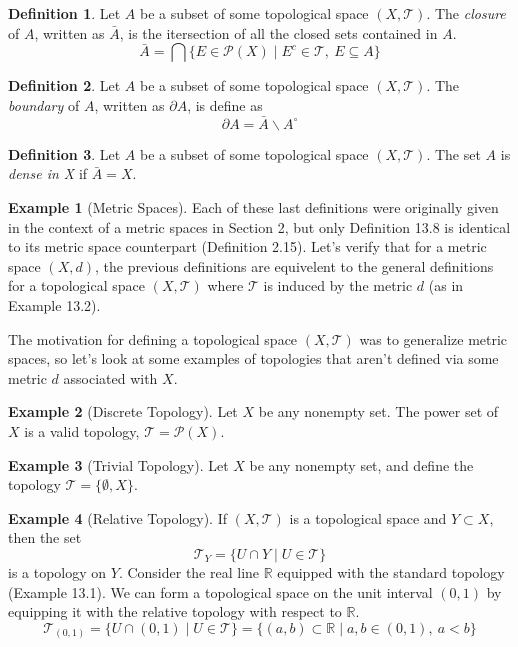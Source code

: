 \documentclass{article}
\newcommand{\R}{\mathbb{R}}
\newcommand{\T}{\mathcal{T}}
\theoremstyle{definition}
\newtheorem{definition}{Definition}[section]
\newtheorem{example}{Example}[section]
\begin{document}
	\begin{definition}\label{def}
		Let $A$ be a subset of some topological space $(X,\T)$. The  \textit{\color{red}closure} of $A$, written as  $\bar A$, is the itersection of all the closed sets contained in $A$.
		$$\bar A = \bigcap\{E\in\mathcal{P}(X)\mid E^c\in\T,\ E\subseteq A \}$$
	\end{definition}
	
	\begin{definition}\label{def}
		Let $A$ be a subset of some topological space $(X,\T)$. The  \textit{\color{red}boundary} of $A$, written as  $\partial A$, is define as 
		$$ \partial A = \bar A \backslash A^\circ$$
	\end{definition}
	
	\begin{definition}\label{def}
		Let $A$ be a subset of some topological space $(X,\T)$.  The set $A$ is \textit{\color{red}dense in X} if $\bar A = X$.
	\end{definition}
	
	
	\begin{example}[Metric Spaces]
		Each of these last definitions were originally given in the context of a metric spaces in Section 2, but only Definition 13.8 is identical to its metric space counterpart (Definition 2.15). Let's verify that for a metric space $(X,d)$, the previous definitions are equivelent to the general definitions for a topological space $(X, \mathcal T)$ where $\mathcal T$ is induced by the metric $d$ (as in Example 13.2). 
	\end{example}


	
	The motivation for defining a topological space $(X,\T)$ was to generalize metric spaces, so let's look at some examples of topologies that aren't defined via some metric $d$ associated with $X$. 
	
	
	\begin{example}[Discrete Topology]
		Let $X$ be any nonempty set. The power set of $X$ is a valid topology, $\mathcal T = \mathcal P(X)$. 
	\end{example}
	\begin{example}[Trivial Topology]
		Let $X$ be any nonempty set, and define the topology $\mathcal T = \{\emptyset, X\}$.
	\end{example}
	\begin{example}[Relative Topology]
		If $(X,\T)$ is a topological space and $Y\subset X$, then the set $$\T_Y=\{U\cap Y\mid U\in \T\}$$ is a topology on $Y$. Consider the real line $\R$ equipped with the standard topology (Example 13.1). We can form a topological space on the unit interval $(0,1)$ by equipping it with the relative topology with respect to $\R$. $$\T_{(0,1)}=\{U\cap (0,1)\mid U\in \T\} = \{(a,b)\subset \R \mid a,b\in(0,1),\ a<b\}$$
	\end{example}
\end{document}
